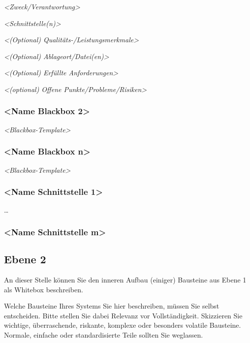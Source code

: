 \documentclass[]{article}
\begin{document}
\emph{\textless{}Zweck/Verantwortung\textgreater{}}

\emph{\textless{}Schnittstelle(n)\textgreater{}}

\emph{\textless{}(Optional) Qualitäts-/Leistungsmerkmale\textgreater{}}

\emph{\textless{}(Optional) Ablageort/Datei(en)\textgreater{}}

\emph{\textless{}(Optional) Erfüllte Anforderungen\textgreater{}}

\emph{\textless{}(optional) Offene
Punkte/Probleme/Risiken\textgreater{}}

\subsubsection{\textless{}Name Blackbox
2\textgreater{}}\label{__name_blackbox_2}

\emph{\textless{}Blackbox-Template\textgreater{}}

\subsubsection{\textless{}Name Blackbox
n\textgreater{}}\label{__name_blackbox_n}

\emph{\textless{}Blackbox-Template\textgreater{}}

\subsubsection{\textless{}Name Schnittstelle
1\textgreater{}}\label{__name_schnittstelle_1}

\ldots{}

\subsubsection{\textless{}Name Schnittstelle
m\textgreater{}}\label{__name_schnittstelle_m}

\subsection{Ebene 2}\label{_ebene_2}

An dieser Stelle können Sie den inneren Aufbau (einiger) Bausteine aus
Ebene 1 als Whitebox beschreiben.

Welche Bausteine Ihres Systems Sie hier beschreiben, müssen Sie selbst
entscheiden. Bitte stellen Sie dabei Relevanz vor Vollständigkeit.
Skizzieren Sie wichtige, überraschende, riskante, komplexe oder
besonders volatile Bausteine. Normale, einfache oder standardisierte
Teile sollten Sie weglassen.
\end{document}
